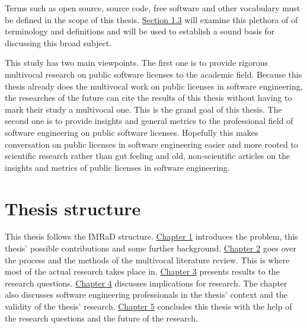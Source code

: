 Terms such as open source, source code, free software and other vocabulary must be defined in the scope of this thesis. \hyperref[sec:bg]{Section 1.3} will examine this plethora of of terminology and definitions and will be used to establish a sound basis for discussing this broad subject.

This study has two main viewpoints. The first one is to provide rigorous multivocal research on public software licenses to the academic field. Because this thesis already does the multivocal work on public licenses in software engineering, the researches of the future can cite the results of this thesis without having to mark their study a multivocal one. This is the grand goal of this thesis. The second one is to provide insights and general metrics to the professional field of software engineering on public software licenses. Hopefully this makes conversation on public licenses in software engineering easier and more rooted to scientific research rather than gut feeling and old, non-scientific articles on the insights and metrics of public licenses in software engineering.

\section{Thesis structure}
This thesis follows the IMRaD structure. \hyperref[intro]{Chapter 1} introduces the problem, this thesis' possible contributions and some further background. \hyperref[methods]{Chapter 2} goes over the process and the methods of the multivocal literature review. This is where most of the actual research takes place in. \hyperref[results]{Chapter 3} presents results to the research questions. \hyperref[discussion]{Chapter 4} discusses implications for research. The chapter also discusses software engineering professionals in the thesis' context and the validity of the thesis' research. \hyperref[conclusions]{Chapter 5} concludes this thesis with the help of the research questions and the future of the research.

